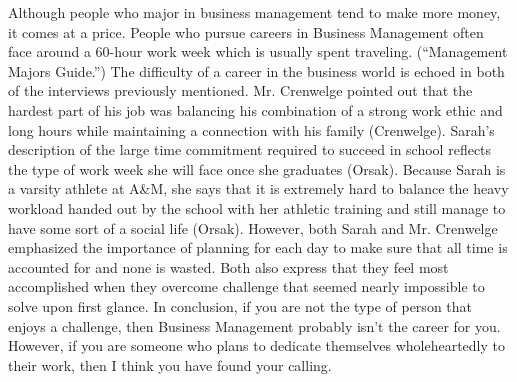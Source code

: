 \begin{multicols}{2}
    Although people who major in business management tend to make more money, it comes at a price. People who pursue careers in Business Management often face around a 60-hour work week which is usually spent traveling. (“Management Majors Guide.”) The difficulty of a career in the business world is echoed in both of the interviews previously mentioned. Mr. Crenwelge pointed out that the hardest part of his job was balancing his combination of a strong work ethic and long hours while maintaining a connection with his family (Crenwelge). Sarah’s description of the large time commitment required to succeed in school reflects the type of work week she will face once she graduates (Orsak). Because Sarah is a varsity athlete at A\&M, she says that it is extremely hard to balance the heavy workload handed out by the school with her athletic training and still manage to have some sort of a social life (Orsak). However, both Sarah and Mr. Crenwelge emphasized the importance of planning for each day to make sure that all time is accounted for and none is wasted. Both also express that they feel most accomplished when they overcome challenge that seemed nearly impossible to solve upon first glance. In conclusion, if you are not the type of person that enjoys a challenge, then Business Management probably isn’t the career for you. However, if you are someone who plans to dedicate themselves wholeheartedly to their work, then I think you have found your calling. 
\end{multicols}